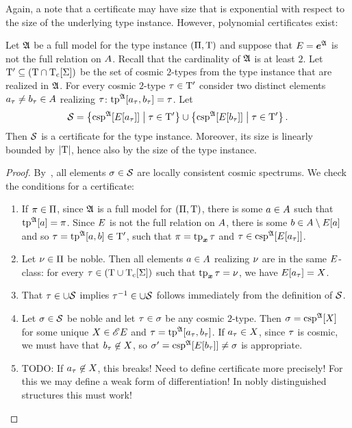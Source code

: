 Again, a note that a certificate may have size that is exponential with respect
to the size of the underlying type instance. However, polynomial certificates
exist:

\begin{lemma} Let $\mathfrak{A}$ be a full model for the type
instance $(\Pi,\mathrm{T})$ and suppose that $E = \bm{e}^{\mathfrak{A}}$ is not the full
relation on $A$. Recall that the cardinality of $\mathfrak{A}$ is at least $2$.
Let ${\mathrm{T}'} \subseteq (\mathrm{T} \cap \mathrm{T}_{\mathrm{c}}[\mathrm{\Sigma}])$ be the set of cosmic $2$-types
from the type instance that are realized in $\mathfrak{A}$. For every cosmic $2$-type
$\tau \in {\mathrm{T}'}$ consider two distinct elements $a_\tau \neq b_\tau \in
A$ realizing $\tau$: $\operatorname{tp}^{\mathfrak{A}}[a_\tau,b_\tau] = \tau$.
Let
\[
  \mathcal{S} = \left\{\operatorname{csp}^{\mathfrak{A}}[E[a_\tau]]\mathrel{}\middle|\mathrel{}\tau \in {\mathrm{T}'}\right\} \cup
  \left\{\operatorname{csp}^{\mathfrak{A}}[E[b_\tau]]\mathrel{}\middle|\mathrel{}\tau \in {\mathrm{T}'}\right\}.
\]
Then $\mathcal{S}$ is a certificate for the type instance. Moreover, its size is
linearly bounded by $\left|\mathrm{T}\right|$, hence also by the size of the type instance.
\end{lemma}
\begin{proof}
By~, all elements $\sigma \in \mathcal{S}$ are
locally consistent cosmic spectrums. We check the conditions for a certificate:
\begin{enumerate}
  \item If $\pi \in \Pi$, since $\mathfrak{A}$ is a full model for
  $(\Pi,\mathrm{T})$, there is some $a \in A$ such that $\operatorname{tp}^{\mathfrak{A}}[a] =
  \pi$. Since $E$ is not the full relation on $A$, there is some $b
  \in A \setminus E[a]$ and so $\tau = \operatorname{tp}^{\mathfrak{A}}[a,b] \in {\mathrm{T}'}$, such
  that $\pi = \operatorname{tp}_{\bm{x}}\tau$ and $\tau \in \operatorname{csp}^{\mathfrak{A}}[E[a_\tau]]$.
  \item Let $\nu \in \Pi$ be noble. Then all elements $a \in A$
  realizing $\nu$ are in the same $E$-class: for every $\tau \in (\mathrm{T}
  \cup \mathrm{T}_{\mathrm{c}}[\mathrm{\Sigma}])$ such that $\operatorname{tp}_{\bm{x}}\tau = \nu$, we have $E[a_\tau] =
  X$.
  \item That $\tau \in \cup\mathcal{S}$ implies $\tau^{-1} \in \cup\mathcal{S}$ follows
  immediately from the definition of $\mathcal{S}$.
  \item Let $\sigma \in \mathcal{S}$ be noble and let $\tau \in \sigma$ be any cosmic
  $2$-type. Then $\sigma = \operatorname{csp}^{\mathfrak{A}}[X]$ for some unique $X \in
  {\mathscr{E}E}$ and $\tau = \operatorname{tp}^{\mathfrak{A}}[a_\tau,b_\tau]$. If $a_\tau \in X$, since
  $\tau$ is cosmic, we must have that $b_\tau \not\in X$, so
  $\sigma' = \operatorname{csp}^{\mathfrak{A}}[E[b_\tau]] \neq \sigma$ is appropriate.
  \item TODO: If $a_\tau \not\in X$, this breaks! Need to define
  certificate more precisely! For this we may define a weak form of
  differentiation! In nobly distinguished structures this must work!
\end{enumerate}
\end{proof}
